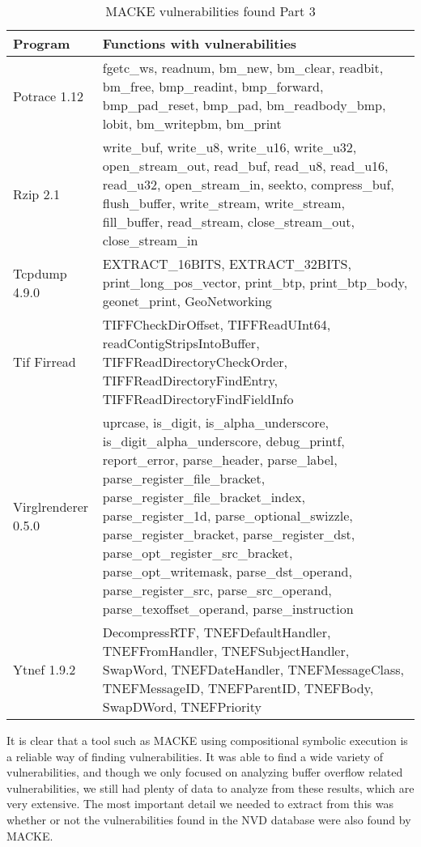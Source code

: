 \begin{table}[H]
	\centering
	\caption{MACKE vulnerabilities found Part 3}
	\begin{tabular}{ |p{4cm}||p{10cm}|  }
		\hline
		Program & Functions with vulnerabilities\\
		\hline
		Potrace 1.12    & fgetc\_ws, readnum, bm\_new, bm\_clear, readbit, bm\_free, bmp\_readint, bmp\_forward, bmp\_pad\_reset, bmp\_pad, bm\_readbody\_bmp, lobit, bm\_writepbm, bm\_print \\
		Rzip 2.1    & write\_buf, write\_u8, write\_u16, write\_u32, open\_stream\_out, read\_buf, read\_u8, read\_u16, read\_u32, open\_stream\_in, seekto, compress\_buf, flush\_buffer, write\_stream, write\_stream, fill\_buffer, read\_stream, close\_stream\_out, close\_stream\_in \\
		Tcpdump 4.9.0    & EXTRACT\_16BITS, EXTRACT\_32BITS, print\_long\_pos\_vector, print\_btp, print\_btp\_body, geonet\_print, GeoNetworking \\
		Tif Firread    & TIFFCheckDirOffset, TIFFReadUInt64, readContigStripsIntoBuffer, TIFFReadDirectoryCheckOrder, TIFFReadDirectoryFindEntry, TIFFReadDirectoryFindFieldInfo \\
		Virglrenderer 0.5.0    & uprcase, is\_digit, is\_alpha\_underscore, is\_digit\_alpha\_underscore, debug\_printf, report\_error, parse\_header, parse\_label, parse\_register\_file\_bracket, parse\_register\_file\_bracket\_index, parse\_register\_1d, parse\_optional\_swizzle, parse\_register\_bracket, parse\_register\_dst, parse\_opt\_register\_src\_bracket, parse\_opt\_writemask, parse\_dst\_operand, parse\_register\_src, parse\_src\_operand, parse\_texoffset\_operand, parse\_instruction \\
		Ytnef 1.9.2    & DecompressRTF, TNEFDefaultHandler, TNEFFromHandler, TNEFSubjectHandler, SwapWord, TNEFDateHandler, TNEFMessageClass, TNEFMessageID, TNEFParentID, TNEFBody, SwapDWord, TNEFPriority \\
		\hline
	\end{tabular}
\end{table}

It is clear that a tool such as MACKE using compositional symbolic execution is a reliable way of finding vulnerabilities. It was able to find a wide variety of vulnerabilities, and though we only focused on analyzing buffer overflow related vulnerabilities, we still had plenty of data to analyze from these results, which are very extensive. The most important detail we needed to extract from this was whether or not the vulnerabilities found in the NVD database were also found by MACKE.

